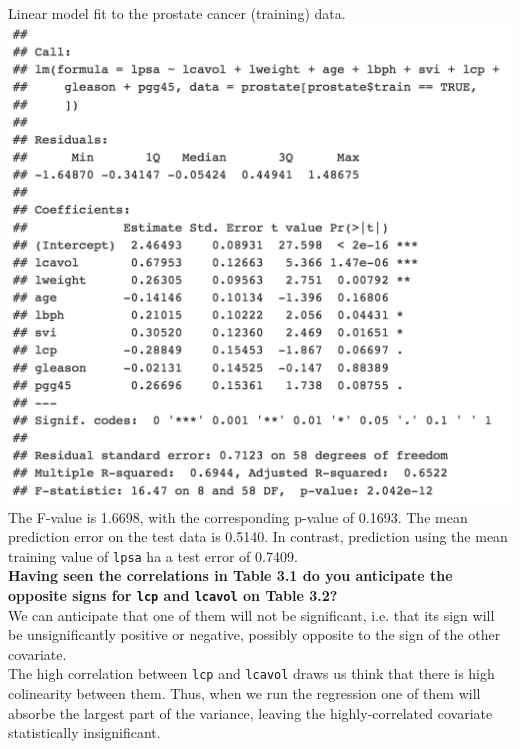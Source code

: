 \documentclass[a4paper, 11pt]{article}
\begin{document}
\newline Linear model fit to the prostate cancer (training) data.\\
\newline \includegraphics[scale=0.7]{ps1_plot_reg2.png}\\
\newline The F-value is 1.6698, with the corresponding p-value of 0.1693. The mean prediction error on the test data is 0.5140. In contrast, prediction using the mean training value of \texttt{lpsa} ha a test error of 0.7409.\\
\newline \textbf{Having seen the correlations in Table 3.1 do you anticipate the opposite signs for \texttt{lcp} and \texttt{lcavol} on Table 3.2?}\\
\newline We can anticipate that one of them will not be significant, i.e. that its sign will be unsignificantly positive or negative, possibly opposite to the sign of the other covariate.\\
\newline The high correlation between \texttt{lcp} and \texttt{lcavol} draws us think that there is high colinearity between them. Thus, when we run the regression one of them will absorbe the largest part of the variance, leaving the highly-correlated covariate statistically insignificant.\\
\end{document}
